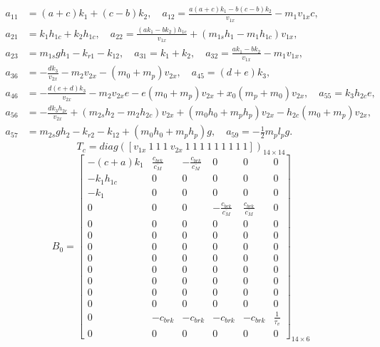         \begin{equation*}
        \begin{aligned}
        a_{11} &= (a + c)k_1 + (c - b)k_2, \quad
        a_{12} = \frac{a(a + c)k_1 - b(c - b)k_2}{v_{1x}} - m_1 v_{1x} c, \\
        a_{21} &= k_1 h_{1c} + k_2 h_{1c}, \quad
        a_{22} = \frac{(a k_1 - b k_2) h_{1c}}{v_{1x}} + (m_{1s} h_1 - m_1 h_{1c}) v_{1x}, \\
        a_{23} &= m_{1s} g h_1 - k_{r1} - k_{12}, \quad
        a_{31} = k_1 + k_2, \quad
        a_{32} = \frac{a k_1 - b k_2}{v_{1x}} - m_1 v_{1x}, \\
        a_{36} &= -\frac{d k_3}{v_{2x}} - m_2 v_{2x} - (m_0 + m_p) v_{2x}, \quad
        a_{45} = (d + e)k_3, \\
        a_{46} &= -\frac{d(e + d)k_3}{v_{2x}} - m_2 v_{2x} e - e(m_0 + m_p) v_{2x} + x_0 (m_p + m_0) v_{2x}, \quad
        a_{55} = k_3 h_{2c} e, \\
        a_{56} &= -\frac{d k_3 h_{2c}}{v_{2x}} + (m_{2s} h_2 - m_2 h_{2c}) v_{2x} + (m_0 h_0 + m_p h_p) v_{2x} - h_{2c} (m_0 + m_p) v_{2x}, \\
        a_{57} &= m_{2s} g h_2 - k_{r2} - k_{12} + (m_0 h_0 + m_p h_p) g, \quad
        a_{59} = -\frac{1}{2} m_p l_p g.
        \end{aligned}
        \end{equation*}
        \begin{equation}
        T_c = diag([v_{1x}\ 1\ 1\ 1\ v_{2x}\ 1\ 1\ 1\ 1\ 1\ 1\ 1\ 1\ 1])_{14 \times 14}
        \label{eq:T_c}
        \end{equation}
        \begin{equation}
        B_0 = \begin{bmatrix}
        -(c + a)k_1 & \frac{c_{brk}}{\overline{c_M}} & -\frac{c_{brk}}{\overline{c_M}} & 0 & 0 & 0 \\
        -k_1 h_{1c} & 0 & 0 & 0 & 0 & 0 \\
        -k_1 & 0 & 0 & 0 & 0 & 0 \\
        0 & 0 & 0 & -\frac{c_{brk}}{\overline{c_M}} & \frac{c_{brk}}{\overline{c_M}} & 0 \\
        0 & 0 & 0 & 0 & 0 & 0 \\
        0 & 0 & 0 & 0 & 0 & 0 \\
        0 & 0 & 0 & 0 & 0 & 0 \\
        0 & 0 & 0 & 0 & 0 & 0 \\
        0 & 0 & 0 & 0 & 0 & 0 \\
        0 & 0 & 0 & 0 & 0 & 0 \\
        0 & 0 & 0 & 0 & 0 & 0 \\
        0 & 0 & 0 & 0 & 0 & 0 \\
        0 & -c_{brk} & -c_{brk} & -c_{brk} & -c_{brk} & \frac{1}{\tau_v} \\
        0 & 0 & 0 & 0 & 0 & 0
        \end{bmatrix}_{14 \times 6}
        \label{eq:B_0}
        \end{equation}



